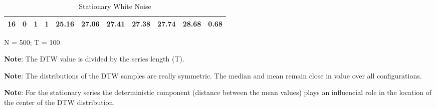 \documentclass[12pt]{article}
\begin{document}
\begin{table}[!htb]
\begin{center}
\begin{tabular}{| r r r r | r r r r r r r |}
        16 & 0 & 1  & 1  & 25.16 & 27.06 & 27.41 & 27.38 & 27.74 & 28.68 & 0.68 \\
        \hline
      \end{tabular}
    \caption{Stationary White Noise}
    \end{center}
    \begin{tablenotes}
        \item{\footnotesize N = 500; T = 100}
        \item {\footnotesize \textbf{Note}: The DTW value is divided by the series length (T).}
        \item {\footnotesize \textbf{Note}: The distributions of the DTW samples are really symmetric. The median and mean remain close in value over all configurations.}
        \item{\footnotesize \textbf{Note}: For the stationary series the deterministic component (distance between the mean values) plays an influencial role in the location of the center of the DTW distribution.}
    \end{tablenotes}
\end{table}
\end{document}
